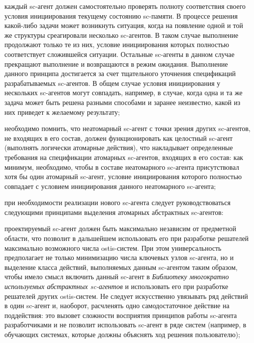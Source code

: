 \begin{SCn}
{\begin{scnitemize}
\begin{scnitemizeii}
\item каждый sc-агент должен самостоятельно проверять полноту соответствия своего условия инициирования текущему состоянию sc-памяти. В процессе решения какой-либо задачи может возникнуть ситуация, когда на появление одной и той же структуры среагировали несколько sc-агентов. В таком случае выполнение продолжают только те из них, условие инициирования которых полностью соответствует сложившейся ситуации. Остальные sc-агенты в данном случае прекращают выполнение и возвращаются в режим ожидания. Выполнение данного принципа достигается за счет тщательного уточнения спецификаций разрабатываемых sc-агентов. В общем случае условия инициирования у нескольких sc-агентов могут совпадать, например, в случае, когда одна и та же задача может быть решена разными способами и заранее неизвестно, какой из них приведет к желаемому результату;

\item необходимо помнить, что неатомарный sc-агент с точки зрения других sc-агентов, не входящих в его состав, должен функционировать как целостный sc-агент (выполнять логически атомарные действия), что накладывает определенные требования на спецификации атомарных sc-агентов, входящих в его состав: как минимум, необходимо, чтобы в составе неатомарного sc-агента присутствовал хотя бы один атомарный sc-агент, условие инициирования которого полностью совпадает с условием инициирования данного неатомарного sc-агента;

\item при необходимости реализации нового sc-агента следует руководствоваться следующими принципами выделения атомарных абстрактных \mbox{sc-агентов}:

\begin{scnenumerate}

\item проектируемый sc-агент должен быть максимально независим от предметной области, что позволит в дальшейшем использовать его при разработке решателей максимально возможного числа ostis-систем. При этом универсальность предполагает не только минимизацию числа ключевых узлов sc-агента, но и выделение класса действий, выполняемых данным sc-агентом таким образом, чтобы имело смысл включить данный sc-агент в \textit{Библиотеку многократно используемых абстрактных sc-агентов} и использовать его при разработке решателей других ostis-систем. Не следует искусственно увязывать ряд действий в один sc-агент и, наоборот, расчленять одно самодостаточное действие на поддействия: это вызовет сложности восприятия принципов работы sc-агента разработчиками и не позволит использовать sc-агент в ряде систем (например, в обучающих системах, которые должны объяснять ход решения пользователю);


\end{scnenumerate}
\end{scnitemizeii}
\end{scnitemize}}
\end{SCn}
